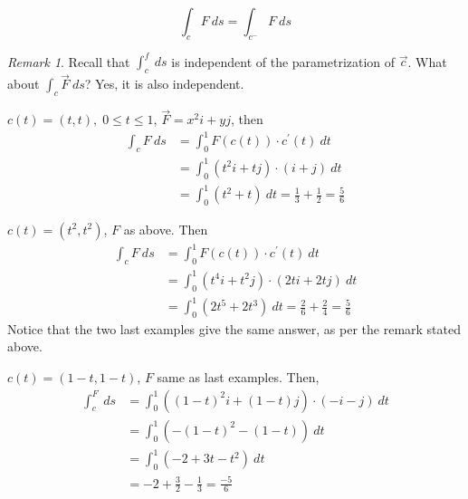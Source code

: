 \documentclass[12pt]{book}
\theoremstyle{definition}
\theoremstyle{remark}
\newtheorem*{remark}{Remark}
\begin{document}
  \begin{proposition}
    $$\int_{{c}}^{{}} {F} \: d{s} = \int_{{c^-}}^{{}} {F} \: d{s} {} $$
  \end{proposition}
  \begin{remark} 
    Recall that $\int_{{c}}^{{f}} {} \: d{s} {}$ is independent of the parametrization of $\vec{{c}} $. What about $\int_{{c}}^{{}} {\vec{{F}} {}} \: d{s} {}$? Yes, it is also independent. 
  \end{remark}
  \begin{example}
    $c(t) = (t,t), \; 0 \leq t\leq 1$, $\vec{{F}} = x^2 i + y j$, then 
    \begin{equation*}
      \begin{split}
        \int_{{c}}^{{}} {F} \: d{s} & = \int_{{0}}^{{1}} {F(c(t)) \cdot c^\prime (t)} \: d{t} \\ 
        &= \int_{{0}}^{{1}} (t^2 i + tj) \cdot (i + j) \: d{t} \\ 
        &= \int_{{0}}^{{1}} {(t^2 + t)} \: d{t} = \frac{1}{3} + \frac{1}{2} = \frac{5}{6} 
      \end{split}
    \end{equation*}
  \end{example}
  \begin{example}$c(t) = (t^2, t^2)$, $F$ as above. Then 
    \begin{equation*}
      \begin{split}
        \int_{{c}}^{{}} {F} \: d{s} &= \int_{{0}}^{{1}} F(c(t))\cdot c^\prime(t) \: d{t}\\ 
        &= \int_{{0}}^{{1}} (t^4 i + t^2 j) \cdot (2ti+ 2tj) \: d{t} \\ 
        &= \int_{{0}}^{{1}} (2t^5 + 2t^3) \: d{t} = \frac{2}{6} + \frac{2}{4} = \frac{5}{6} 
      \end{split}
    \end{equation*}
    Notice that the two last examples give the same answer, as per the remark stated above. 
  \end{example}
  \begin{example}$c(t) =(1-t, 1-t)$, $F$ same as last examples. Then, 
    \begin{equation*}
      \begin{split}
        \int_{{c}}^{{F}} {} \: d{s} &= \int_{{0}}^{{1}} ((1-t)^2 i + (1-t)j) \cdot (-i -j) \: d{t} \\ 
        &= \int_{{0}}^{{1}} (-(1-t)^2 - (1-t)) \: d{t} \\ 
        &= \int_{{0}}^{{1}} (-2 +3t -t^2) \: d{t} \\ 
        &= -2 + \frac{3}{2} -\frac{1}{3} = \frac{-5}{6} 
      \end{split}
    \end{equation*}
  \end{example}
\end{document}
